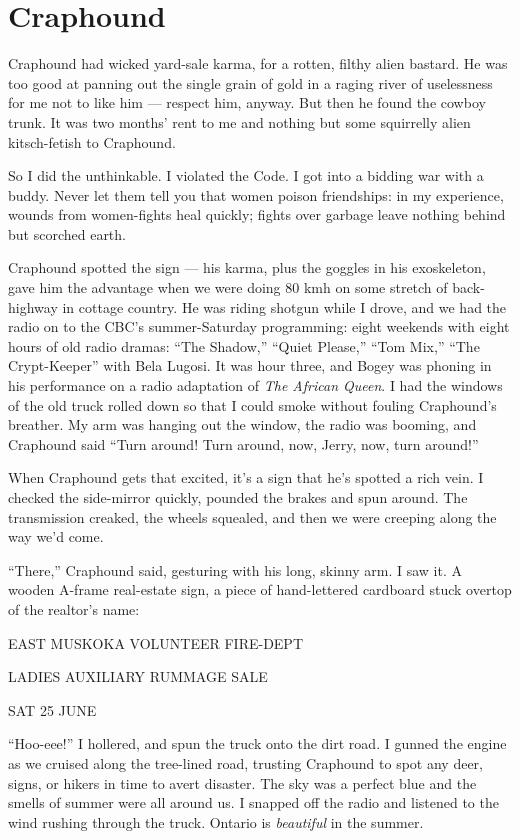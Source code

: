 \section{Craphound}

Craphound had wicked yard-sale karma, for a rotten, filthy alien
bastard. He was too good at panning out the single grain of gold in
a raging river of uselessness for me not to like him --- respect
him, anyway. But then he found the cowboy trunk. It was two months'
rent to me and nothing but some squirrelly alien kitsch-fetish to
Craphound.

So I did the unthinkable. I violated the Code. I got into a bidding
war with a buddy. Never let them tell you that women poison
friendships: in my experience, wounds from women-fights heal
quickly; fights over garbage leave nothing behind but scorched
earth.

Craphound spotted the sign --- his karma, plus the goggles in his
exoskeleton, gave him the advantage when we were doing 80 kmh on
some stretch of back-highway in cottage country. He was riding
shotgun while I drove, and we had the radio on to the CBC's
summer-Saturday programming: eight weekends with eight hours of old
radio dramas: ``The Shadow,'' ``Quiet Please,'' ``Tom Mix,''
``The Crypt-Keeper'' with Bela Lugosi. It was hour three, and Bogey
was phoning in his performance on a radio adaptation of
\emph{The African Queen}. I had the windows of the old truck rolled
down so that I could smoke without fouling Craphound's breather. My
arm was hanging out the window, the radio was booming, and
Craphound said
``Turn around! Turn around, now, Jerry, now, turn around!''

When Craphound gets that excited, it's a sign that he's spotted a
rich vein. I checked the side-mirror quickly, pounded the brakes
and spun around. The transmission creaked, the wheels squealed, and
then we were creeping along the way we'd come.

``There,'' Craphound said, gesturing with his long, skinny arm. I
saw it. A wooden A-frame real-estate sign, a piece of hand-lettered
cardboard stuck overtop of the realtor's name:

\begin{sign}
EAST MUSKOKA VOLUNTEER FIRE-DEPT

LADIES AUXILIARY RUMMAGE SALE

SAT 25 JUNE
\end{sign}

``Hoo-eee!'' I hollered, and spun the truck onto the dirt road. I
gunned the engine as we cruised along the tree-lined road, trusting
Craphound to spot any deer, signs, or hikers in time to avert
disaster. The sky was a perfect blue and the smells of summer were
all around us. I snapped off the radio and listened to the wind
rushing through the truck. Ontario is \emph{beautiful} in the
summer.

